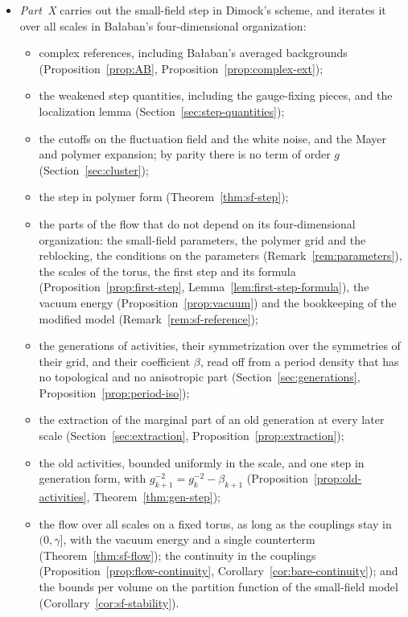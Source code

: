 \begin{itemize}
\item \emph{Part~X} carries out the small-field step in Dimock's scheme, and iterates it over all scales in Ba\l aban's four-dimensional organization:
  \begin{itemize}
  \item complex references, including Ba\l aban's averaged backgrounds (Proposition~\ref{prop:AB}, Proposition~\ref{prop:complex-ext});
  \item the weakened step quantities, including the gauge-fixing pieces, and the localization lemma (Section~\ref{sec:step-quantities});
  \item the cutoffs on the fluctuation field and the white noise, and the Mayer and polymer expansion; by parity there is no term of order $g$ (Section~\ref{sec:cluster});
  \item the step in polymer form (Theorem~\ref{thm:sf-step});
  \item the parts of the flow that do not depend on its four-dimensional organization: the small-field parameters, the polymer grid and the reblocking, the conditions on the parameters (Remark~\ref{rem:parameters}), the scales of the torus, the first step and its formula (Proposition~\ref{prop:first-step}, Lemma~\ref{lem:first-step-formula}), the vacuum energy (Proposition~\ref{prop:vacuum}) and the bookkeeping of the modified model (Remark~\ref{rem:sf-reference});
  \item the generations of activities, their symmetrization over the symmetries of their grid, and their coefficient $\beta$, read off from a period density that has no topological and no anisotropic part (Section~\ref{sec:generations}, Proposition~\ref{prop:period-iso});
  \item the extraction of the marginal part of an old generation at every later scale (Section~\ref{sec:extraction}, Proposition~\ref{prop:extraction});
  \item the old activities, bounded uniformly in the scale, and one step in generation form, with $g_{k+1}^{-2}=g_k^{-2}-\beta_{k+1}$ (Proposition~\ref{prop:old-activities}, Theorem~\ref{thm:gen-step});
  \item the flow over all scales on a fixed torus, as long as the couplings stay in $(0,\gamma]$, with the vacuum energy and a single counterterm (Theorem~\ref{thm:sf-flow}); the continuity in the couplings (Proposition~\ref{prop:flow-continuity}, Corollary~\ref{cor:bare-continuity}); and the bounds per volume on the partition function of the small-field model (Corollary~\ref{cor:sf-stability}).

\end{itemize}
\end{itemize}
